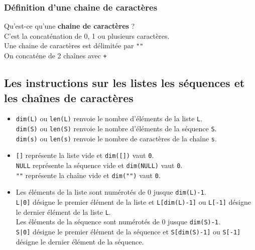 \documentclass[12pt,a4paper]{book}
\begin{document}
\begin{giacjshere}
\subsubsection{D\'efinition d'une chaine de caract\`eres}\index{+}
Qu'est-ce qu'une {\bf chaine de caract\`eres} ?\\
C'est la concat\'enation de 0, 1 ou plusieurs caract\`eres.\\
Une chaine de caract\`eres est d\'elimit\'ee par {\tt ""}\\ 
On concat\'ene de 2 cha\^{i}nes avec {\tt +}\\

\subsection{Les instructions sur les listes les s\'equences et les cha\^ines de caract\`eres}
\begin{itemize}
\item {\tt dim(L)} ou {\tt len(L)}
renvoie le nombre d'\'el\'ements de la liste {\tt L}.\\
{\tt dim(S)}  ou {\tt len(S)} renvoie le nombre d'\'el\'ements de la 
s\'equence {\tt S}.\\
{\tt dim(s)} ou {\tt len(s)} renvoie le nombre de caract\`eres de la cha\^ine 
{\tt s}.
\item
{\tt []} repr\'esente la liste vide et {\tt dim([])} vaut {\tt 0}.\\
{\tt NULL} repr\'esente la s\'equence vide et {\tt dim(NULL)} vaut {\tt 0}.\\
{\tt ""} repr\'esente la cha\^ine vide et {\tt dim("")} vaut {\tt 0}.
\item
Les \'el\'ements de la liste sont num\'erot\'es de 0 jusque {\tt dim(L)-1}.\\
{\tt L|0]} d\'esigne le premier \'el\'ement de la liste et {\tt L[dim(L)-1]} 
 ou {\tt L[-1]} d\'esigne le dernier \'el\'ement de la liste {\tt L}.\\
Les \'el\'ements de la s\'equence sont num\'erot\'es de 0 jusque {\tt dim(S)-1}.\\
{\tt S|0]} d\'esigne le premier \'el\'ement de la s\'equence et 
{\tt S[dim(S)-1]}  ou {\tt S[-1]} d\'esigne le dernier \'el\'ement de la s\'equence.\\

\end{itemize}
\end{giacjshere}
\end{document}
